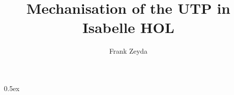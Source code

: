 \documentclass[11pt,a4paper]{article}
\begin{document}
\title{Mechanisation of the UTP in Isabelle HOL}

\author{Frank Zeyda}

\maketitle

\tableofcontents

\newpage

\parindent 0pt\parskip 0.5ex

%



\newpage



\newpage



\newpage



\newpage



\newpage



\newpage



\newpage



\newpage



\newpage



\newpage



\newpage



\newpage



\newpage



\newpage



\newpage



\newpage



\newpage
\end{document}
